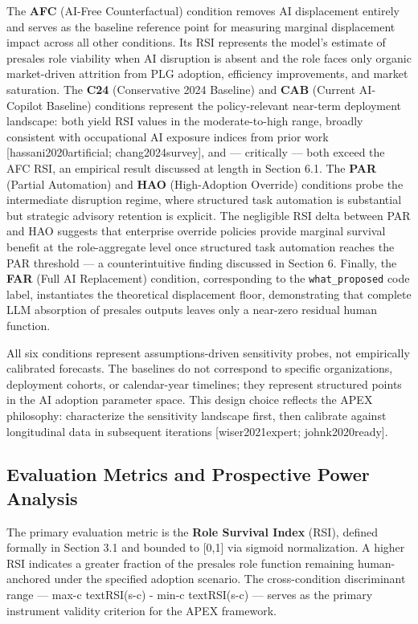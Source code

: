 \documentclass[10pt, conference]{IEEEtran}
\begin{document}
The \textbf{AFC} (AI-Free Counterfactual) condition removes AI displacement entirely and serves as the baseline reference point for measuring marginal displacement impact across all other conditions. Its RSI represents the model's estimate of presales role viability when AI disruption is absent and the role faces only organic market-driven attrition from PLG adoption, efficiency improvements, and market saturation. The \textbf{C24} (Conservative 2024 Baseline) and \textbf{CAB} (Current AI-Copilot Baseline) conditions represent the policy-relevant near-term deployment landscape: both yield RSI values in the moderate-to-high range, broadly consistent with occupational AI exposure indices from prior work [hassani2020artificial; chang2024survey], and --- critically --- both exceed the AFC RSI, an empirical result discussed at length in Section 6.1. The \textbf{PAR} (Partial Automation) and \textbf{HAO} (High-Adoption Override) conditions probe the intermediate disruption regime, where structured task automation is substantial but strategic advisory retention is explicit. The negligible RSI delta between PAR and HAO suggests that enterprise override policies provide marginal survival benefit at the role-aggregate level once structured task automation reaches the PAR threshold --- a counterintuitive finding discussed in Section 6. Finally, the \textbf{FAR} (Full AI Replacement) condition, corresponding to the \texttt{what\_proposed} code label, instantiates the theoretical displacement floor, demonstrating that complete LLM absorption of presales outputs leaves only a near-zero residual human function.

All six conditions represent assumptions-driven sensitivity probes, not empirically calibrated forecasts. The baselines do not correspond to specific organizations, deployment cohorts, or calendar-year timelines; they represent structured points in the AI adoption parameter space. This design choice reflects the APEX philosophy: characterize the sensitivity landscape first, then calibrate against longitudinal data in subsequent iterations [wiser2021expert; johnk2020ready].

\subsection{Evaluation Metrics and Prospective Power Analysis}

\label{sec:evaluation\_metrics\_and\_prospective\_power}

The primary evaluation metric is the \textbf{Role Survival Index} (RSI), defined formally in Section 3.1 and bounded to [0,1] via sigmoid normalization. A higher RSI indicates a greater fraction of the presales role function remaining human-anchored under the specified adoption scenario. The cross-condition discriminant range --- max-c textRSI(s-c) - min-c textRSI(s-c) --- serves as the primary instrument validity criterion for the APEX framework.
\end{document}
